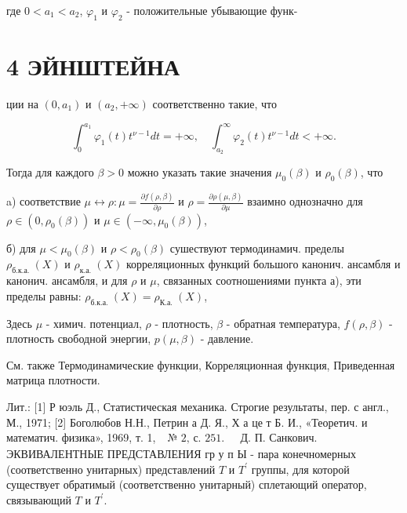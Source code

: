\documentclass[10pt]{article}
\begin{document}
где $0<a_{1}<a_{2}$, $\varphi_{1}$ и $\varphi_{2}$ - положительные убывающие функ-



\section{4 ЭЙНШТЕЙНА}

ции на $\left(0, a_{1}\right)$ и $\left(a_{2},+\infty\right)$ соответственно такие, что



\[

\int_{0}^{a_{1}} \varphi_{1}(t) t^{\nu-1} d t=+\infty, \quad \int_{a_{2}}^{\infty} \varphi_{2}(t) t^{\nu-1} d t<+\infty .

\]



Тогда для каждого $\beta>0$ можно указать такие значения $\mu_{0}(\beta)$ и $\rho_{0}(\beta)$, что



a) соответствие $\mu \leftrightarrow \rho: \mu=\frac{\partial f(\rho, \beta)}{\partial \rho}$ и $\rho=\frac{\partial \rho(\mu, \beta)}{\partial \mu}$ взаимно однозначно для $\rho \in\left(0, \rho_{0}(\beta)\right)$ и $\mu \in\left(-\infty, \mu_{0}(\beta)\right)$,



б) для $\mu<\mu_{0}(\beta)$ и $\rho<\rho_{0}(\beta)$ сушествуют термодинамич. пределы $\rho_{\text {б.к.а. }}(X)$ и $\rho_{\text {к.а. }}(X)$ корреляционных функций большого канонич. ансамбля и канонич. ансамбля, и для $\rho$ и $\mu$, связанных соотношениями пункта а), эти пределы равны: $\rho_{\text {б.к.а. }}(X)=\rho_{\text {К.а. }}(X)$,



Здесь $\mu$ - химич. потенциал, $\rho$ - плотность, $\beta$ - обратная температура, $f(\rho, \beta)$ - плотность свободной энергии, $p(\mu, \beta)$ - давление.



См. также Термодинамические функции, Корреляционная функция, Приведенная матрица плотности.



Лит.: [1] Р юэль Д., Статистическая механика. Строгие результаты, пер. с англ., М., 1971; [2] Боголюбов Н.Н., Петрин а Д. Я., Х а це т Б. И., «Теоретич. и математич. физика», 1969, т. 1, $\begin{array}{ll}\text { № 2, с. } 251 \text {. } & \text { Д. П. Санкович. }\end{array}$ ЭКВИВАЛЕНТНЫЕ ПРЕДСТАВЛЕНИЯ гр у п Ы - пара конечномерных (соответственно унитарных) представлений $T$ и $T^{\prime}$ группы, для которой существует обратимый (соответственно унитарный) сплетающий оператор, связывающий $T$ и $T^{\prime}$.
\end{document}

